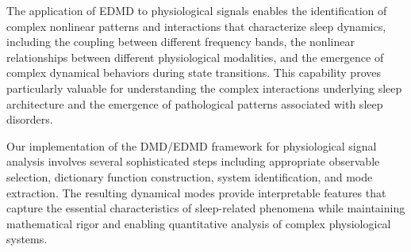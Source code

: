 \documentclass[a4paper,12pt,twoside]{article}
\begin{document}
The application of EDMD to physiological signals enables the identification of complex nonlinear patterns and interactions that characterize sleep dynamics, including the coupling between different frequency bands, the nonlinear relationships between different physiological modalities, and the emergence of complex dynamical behaviors during state transitions. This capability proves particularly valuable for understanding the complex interactions underlying sleep architecture and the emergence of pathological patterns associated with sleep disorders.

Our implementation of the DMD/EDMD framework for physiological signal analysis involves several sophisticated steps including appropriate observable selection, dictionary function construction, system identification, and mode extraction. The resulting dynamical modes provide interpretable features that capture the essential characteristics of sleep-related phenomena while maintaining mathematical rigor and enabling quantitative analysis of complex physiological systems.
\end{document}
